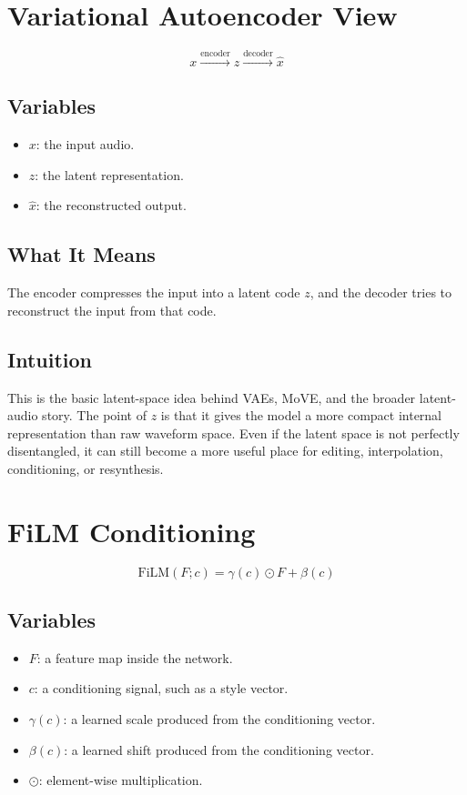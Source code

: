 \documentclass[11pt]{article}
\begin{document}
\section{Variational Autoencoder View}

\begin{equation*}
x \xrightarrow{\text{encoder}} z \xrightarrow{\text{decoder}} \hat{x}
\end{equation*}

\subsection*{Variables}
\begin{itemize}
\item \(x\): the input audio.
\item \(z\): the latent representation.
\item \(\hat{x}\): the reconstructed output.
\end{itemize}

\subsection*{What It Means}
The encoder compresses the input into a latent code \(z\), and the decoder tries to reconstruct the input from that code.

\subsection*{Intuition}
This is the basic latent-space idea behind VAEs, MoVE, and the broader latent-audio story. The point of \(z\) is that it gives the model a more compact internal representation than raw waveform space. Even if the latent space is not perfectly disentangled, it can still become a more useful place for editing, interpolation, conditioning, or resynthesis.

\section{FiLM Conditioning}

\begin{equation*}
\mathrm{FiLM}(F;c)=\gamma(c)\odot F+\beta(c)
\end{equation*}

\subsection*{Variables}
\begin{itemize}
\item \(F\): a feature map inside the network.
\item \(c\): a conditioning signal, such as a style vector.
\item \(\gamma(c)\): a learned scale produced from the conditioning vector.
\item \(\beta(c)\): a learned shift produced from the conditioning vector.
\item \(\odot\): element-wise multiplication.
\end{itemize}
\end{document}
